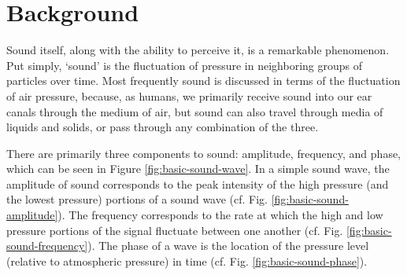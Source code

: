 \section{Background}\label{ch1:background}

Sound itself, along with the ability to perceive it, is a remarkable phenomenon.  Put simply, `sound' is the fluctuation of pressure in neighboring groups of particles over time. Most frequently sound is discussed in terms of the fluctuation of air pressure, because, as humans, we primarily receive sound into our ear canals through the medium of air, but sound can also travel through media of liquids and solids, or pass through any combination of the three.

There are primarily three components to sound: amplitude, frequency, and phase, which can be seen in Figure \ref{fig:basic-sound-wave}.  In a simple sound wave, the amplitude of sound corresponds to the peak intensity of the high pressure (and the lowest pressure) portions of a sound wave (cf. Fig. \ref{fig:basic-sound-amplitude}).  The frequency corresponds to the rate at which the high and low pressure portions of the signal fluctuate between one another (cf. Fig. \ref{fig:basic-sound-frequency}).  The phase of a wave is the location of the pressure level (relative to atmospheric pressure) in time (cf. Fig. \ref{fig:basic-sound-phase}).   

